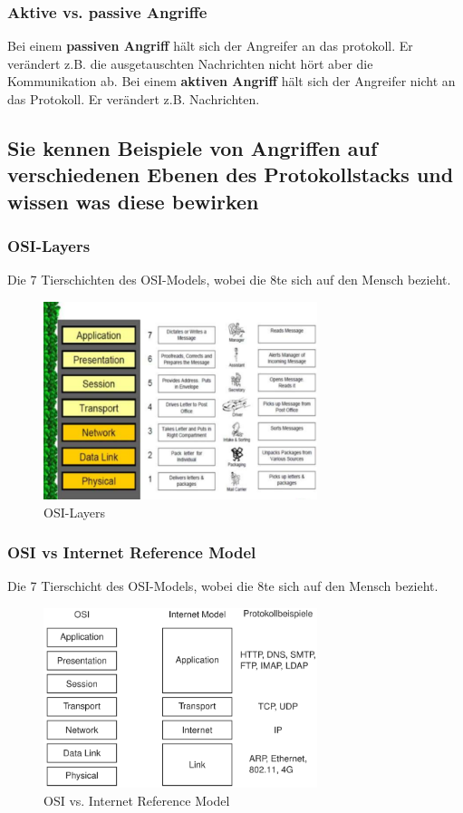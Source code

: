 \documentclass[10pt,a4paper]{article}
\begin{document}
\subsubsection*{Aktive vs. passive Angriffe}
Bei einem \textbf{passiven Angriff} hält sich der Angreifer an das protokoll. Er verändert z.B. die ausgetauschten Nachrichten nicht hört aber die Kommunikation ab.
Bei einem \textbf{aktiven Angriff} hält sich der Angreifer nicht an das Protokoll. Er verändert z.B. Nachrichten.

\subsection*{Sie kennen Beispiele von Angriffen auf verschiedenen Ebenen des Protokollstacks und wissen was diese bewirken}

\subsubsection*{OSI-Layers}
Die 7 Tierschichten des OSI-Models, wobei die 8te sich auf den Mensch bezieht.

\begin{figure}[H]
    \begin{center}
    \includegraphics[width=8cm]{images/OSI-Layers.png}
    \caption{OSI-Layers}
    \label{OSI-Layers}
    \end{center}
\end{figure}

\subsubsection*{OSI vs Internet Reference Model}
Die 7 Tierschicht des OSI-Models, wobei die 8te sich auf den Mensch bezieht.

\begin{figure}[H]
    \begin{center}
    \includegraphics[width=8cm]{images/OSIvsIRM.png}
    \caption{OSI vs. Internet Reference Model}
    \label{OSIvsIRM}
    \end{center}
\end{figure}
\end{document}
